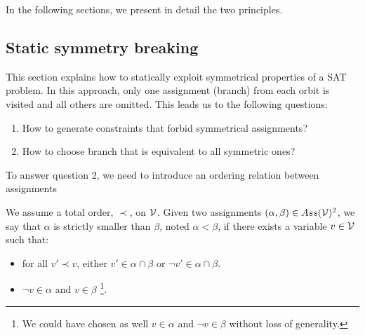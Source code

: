 In the following sections, we present in detail the two principles.


\subsection{Static symmetry breaking}




This section explains how to statically exploit symmetrical properties of a SAT problem.
In this approach, only one assignment (branch) from each orbit is visited and all others are
omitted.%
This leads us to the following questions:
\begin{enumerate}
	\item How to generate constraints that forbid symmetrical assignments?
	\item How  to choose branch that is equivalent to all symmetric ones?
\end{enumerate}

To answer question 2, we need to introduce an ordering relation between assignments
\clearpage

\begin{definition}\label{def:assignment_ordering}%
 We assume a total order, $\prec$, on $\mathcal{V}$.  Given two assignments $(\alpha,\beta) \in Ass(\mathcal{V})^2 $,%
 we say that $\alpha$ is strictly smaller than $\beta$, noted $\alpha < \beta$, if there exists a variable $v \in \mathcal{V}$%
 such that:%
 \begin{itemize}%
  \item for all $v' \prec v$, either $v' \in \alpha \cap \beta$ or $\neg v' \in \alpha \cap \beta$.%
  \item $\neg v \in \alpha$ and $v \in \beta$ \footnote{We could have chosen as well $v \in \alpha$ and $\neg v \in \beta$ without loss of generality.}.%
 \end{itemize}%
\end{definition}

